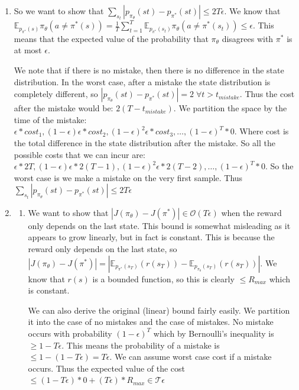 \documentclass[11pt]{article}
\begin{document}
\begin{enumerate}
    \item So we want to show that $\sum_{s_t} \left| p_{\pi_\theta}(st) - p_{\pi^*}(st) \right| \leq 2T\epsilon$.
    We know that $\mathbb{E}_{p_{\pi^*}(s)} \pi_\theta(a \neq \pi^*(s)) = \frac{1}{T} \sum^{T}_{t=1} \mathbb{E}_{p_{\pi^*}(s_t)} \pi_\theta(a \neq \pi^*(s_t)) \leq \epsilon$.
    This means that the expected value of the probability that $\pi_\theta$ disagrees with $\pi^*$ is at most $\epsilon$.
    
    We note that if there is no mistake, then there is no difference in the state distribution. 
    In the worst case, after a mistake the state distribution is completely different, so $\left| p_{\pi_\theta}(st) - p_{\pi^*}(st) \right| = 2 \; \forall t>t_{mistake}$.
    Thus the cost after the mistake would be: $2(T - t_{mistake})$.
    We partition the space by the time of the mistake:
    $\epsilon * cost_1 , (1-\epsilon)\epsilon * cost_2 , (1-\epsilon)^2\epsilon *cost_3 , \dots , (1 - \epsilon)^T * 0$.
    Where cost is the total difference in the state distribution after the mistake.
    So all the possible costs that we can incur are: $\epsilon * 2T , (1-\epsilon)\epsilon * 2(T-1) , (1-\epsilon)^2\epsilon *2(T-2) , \dots , (1 - \epsilon)^T * 0$.
    So the worst case is we make a mistake on the very first sample.
    Thus $\sum_{s_t} \left| p_{\pi_\theta}(st) - p_{\pi^*}(st) \right| \leq 2T\epsilon$

    \item \begin{enumerate}
        \item We want to show that $|J(\pi_\theta) - J(\pi^*)| \in \mathcal{O}(T\epsilon)$ when the reward only depends on the last state.
        This bound is somewhat misleading as it appears to grow linearly, but in fact is constant. 
        This is because the reward only depends on the last state, so $|J(\pi_\theta) - J(\pi^*)| = |\mathbb{E}_{p_{\pi^*}(s_T)}(r(s_T)) - \mathbb{E}_{p_{\pi_\theta}(s_T)}(r(s_T))|$.
        We know that $r(s)$ is a bounded function, so this is clearly $\leq R_{max}$ which is constant.

        We can also derive the original (linear) bound fairly easily. We partition it into the case of no mistakes and the case of mistakes.
        No mistake occurs with probability $(1-\epsilon)^T$ which by Bernoulli's inequality is $\geq 1 - T\epsilon$.
        This means the probability of a mistake is $\leq 1 - (1 - T\epsilon) = T\epsilon$. We can assume worst case cost if a mistake occurs.
        Thus the expected value of the cost $\leq (1 - T \epsilon) *0 + (T\epsilon)*R_{max} \in \mathcal{T\epsilon}$


\end{enumerate}
\end{enumerate}
\end{document}

